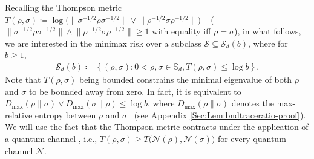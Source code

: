 \documentclass[a4paper,onecolumn,11pt,accepted=2026-05-12]{quantumarticle}
\newcommand{\cN}{\mathcal{N}}
\newcommand{\cS}{\mathcal{S}}
\begin{document}
Recalling the Thompson metric
$T(\rho,\sigma)\coloneqq \log \!\big(\big\|\sigma^{-1/2}\rho \sigma^{-1/2}\big\| \vee  \big\|\rho^{-1/2} \sigma \rho^{-1/2}\big\|\big)$ ~\cite{thompson_1963} ($\big\|\sigma^{-1/2} \rho \sigma^{-1/2}\big\| \wedge \big\|\rho^{-1/2} \sigma \rho^{-1/2}\big\| \geq 1$ with equality iff $\rho=\sigma$), in what follows, we are interested in the minimax risk over a subclass $\cS \subseteq \cS_d(b)$, where  for $b \geq 1$, 
  \begin{align}
      \cS_d(b)\coloneqq \left\{(\rho,\sigma): 0<\rho,\sigma \in \mathbb{S}_d, T(\rho,\sigma)\leq \log b\right\}. \label{eq:densityopclass}
  \end{align}
Note that  $T(\rho,\sigma)$ being bounded constrains the minimal eigenvalue of both $\rho$ and $\sigma$ to be bounded away from zero. In fact, it is equivalent to $D_{\max}(\rho\|\sigma) \vee D_{\max}(\sigma\|\rho) \leq \log b$, where $D_{\max}(\rho\|\sigma)$ denotes the max-relative entropy between $\rho$ and $\sigma$~\cite{Datta-2009} (see Appendix \ref{Sec:Lem:bndtraceratio-proof}).  
We will use the fact that the Thompson metric contracts under the application of a quantum channel \cite[Lemma 7]{Datta-2009}, i.e., $T(\rho,\sigma) \geq T\big(\cN(\rho),\cN(\sigma)\big) $ for every quantum channel $\cN$.  
\end{document}
